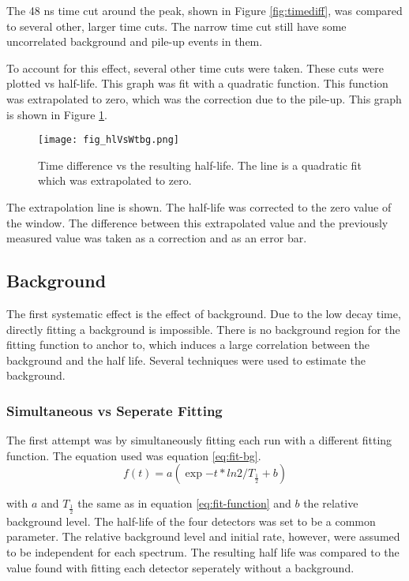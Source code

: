 \documentclass[main.tex]{subfiles}
\begin{document}
The 48 ns time cut around the peak, shown in Figure \ref{fig:timediff}, was compared to several other, larger time cuts.
The narrow time cut still have some uncorrelated background and pile-up events in them.


To account for this effect, several other time cuts were taken.
These cuts were plotted vs half-life.
This graph was fit with a quadratic function.
This function was extrapolated to zero, which was the correction due to the pile-up.
This graph is shown in Figure \ref{fig:timediffvhl}. 

\begin{figure}[!htb]
\centerline{\texttt{[image: fig\_hlVsWtbg.png]}}
\caption{Time difference vs the resulting half-life.
	 The line is a quadratic fit which was extrapolated to zero.
	}
\label{fig:timediffvhl}
\end{figure}
 
The extrapolation line is shown.
The half-life was corrected to the zero value of the window.
The difference between this extrapolated value and the previously measured value was taken as a correction and as an error bar.
 
\subsection{Background}

The first systematic effect is the effect of background.
Due to the low decay time, directly fitting a background is impossible.
There is no background region for the fitting function to anchor to, which induces a large correlation between the background and the half life.
Several techniques were used to estimate the background.

\subsubsection{Simultaneous vs Seperate Fitting}
The first attempt was by simultaneously fitting each run with a different fitting function.
The equation used was equation \ref{eq:fit-bg}. 
%
\begin{equation}
	f(t) = a(\exp{-t*ln2/T_{\frac{1}{2}}} + b)
	\label{eq:fit-bg}
\end{equation}
%

with $a$ and $T_{\frac{1}{2}}$ the same as in equation \ref{eq:fit-function} and $b$ the relative background level.
The half-life of the four detectors was set to be a common parameter. 
The relative background level and initial rate, however, were assumed to be independent for each spectrum.
The resulting half life was compared to the value found with fitting each detector seperately without a background.
\end{document}
